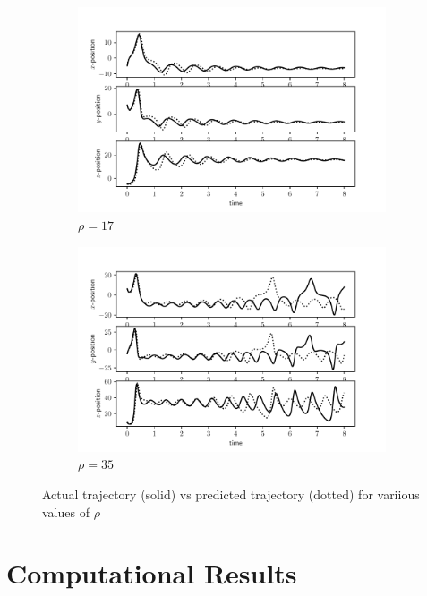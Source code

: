 \documentclass[10pt]{article}
\begin{document}
\begin{figure}[t!]\centering
\begin{subfigure}{.45\textwidth}\centering
\includegraphics[width=\textwidth]{img/NN_lrz17_trajectory.pdf}
\caption{\( \rho = 17 \)}
\end{subfigure}\hfill
\begin{subfigure}{.45\textwidth}\centering
\includegraphics[width=\textwidth]{img/NN_lrz35_trajectory.pdf} \hfill
\caption{\( \rho = 35 \)}
\end{subfigure}
\caption{Actual trajectory (solid) vs predicted trajectory (dotted) for variious values of \( \rho \)}
\label{xyz_trajectory}
\end{figure}




\section{Computational Results}
\end{document}
